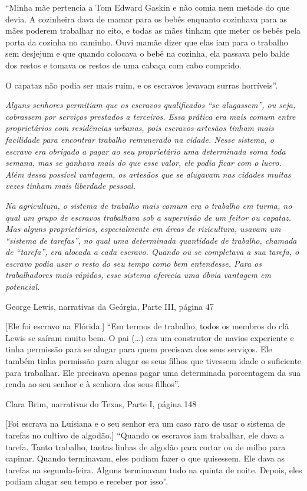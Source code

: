 ``Minha mãe pertencia a Tom Edward Gaskin e não comia nem metade do que
devia. A cozinheira dava de mamar para os bebês enquanto cozinhava para
as mães poderem trabalhar no eito, e todas as mães tinham que meter os
bebês pela porta da cozinha no caminho. Ouvi mamãe dizer que elas iam
para o trabalho sem desjejum e que quando colocava o bebê na cozinha,
ela passava pelo balde dos restos e tomava os restos de uma cabaça com
cabo comprido.

O capataz não podia ser mais ruim, e os escravos levavam surras
horríveis''.

\emph{Alguns senhores permitiam que os escravos qualificados ``se
alugassem'', ou seja, cobrassem por serviços prestados a terceiros. Essa
prática era mais comum entre proprietários com residências urbanas, pois
escravos-artesãos tinham mais facilidade para encontrar trabalho
remunerado na cidade. Nesse sistema, o escravo era obrigado a pagar ao
seu proprietário uma determinada soma toda semana, mas se ganhava mais
do que esse valor, ele podia ficar com o lucro. Além dessa possível
vantagem, os artesãos que se alugavam nas cidades muitas vezes tinham
mais liberdade pessoal.}

\emph{Na agricultura, o sistema de trabalho mais comum era o trabalho em
turma, no qual um grupo de escravos trabalhava sob a supervisão de um
feitor ou capataz. Mas alguns proprietários, especialmente em áreas de
rizicultura, usavam um ``sistema de tarefas'', no qual uma determinada
quantidade de trabalho, chamada de ``tarefa'', era alocada a cada
escravo. Quando ou se completava a sua tarefa, o escravo podia usar o
resto do seu tempo como bem entendesse. Para os trabalhadores mais
rápidos, esse sistema oferecia uma óbvia vantagem em potencial.}

George Lewis, narrativas da Geórgia, Parte III, página 47

{[}Ele foi escravo na Flórida.{]} ``Em termos de trabalho, todos os
membros do clã Lewis se saíram muito bem. O pai (\ldots{}) era um
construtor de navios experiente e tinha permissão para se alugar para
quem precisava dos seus serviços. Ele também tinha permissão para alugar
os seus filhos que tivessem idade o suficiente para trabalhar. Ele
precisava apenas pagar uma determinada porcentagem da sua renda ao seu
senhor e à senhora dos seus filhos''.

Clara Brim, narrativas do Texas, Parte I, página 148

{[}Foi escrava na Luisiana e o seu senhor era um caso raro de usar o
sistema de tarefas no cultivo de algodão.{]} ``Quando os escravos iam
trabalhar, ele dava a tarefa. Tanto trabalho, tantas linhas de algodão
para cortar ou de milho para capinar. Quando terminavam, eles podiam
fazer o que quisessem. Ele dava as tarefas na segunda-feira. Alguns
terminavam tudo na quinta de noite. Depois, eles podiam alugar seu tempo
e receber por isso''.

